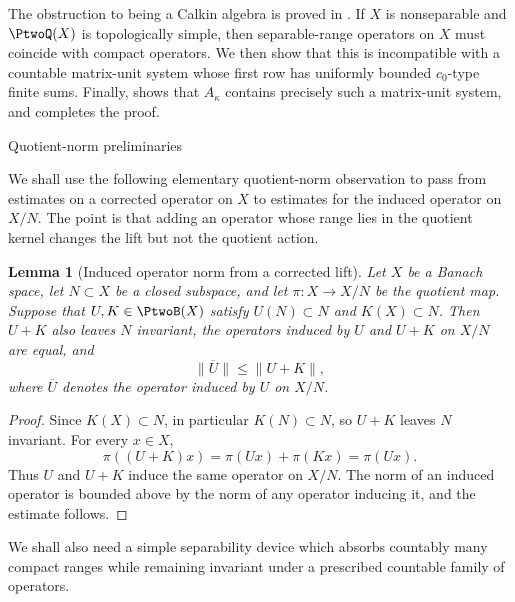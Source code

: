 \documentclass[11pt,reqno]{amsart}
\makeatletter
\theoremstyle{plain}
\newtheorem{lemma}[lemma]{Lemma}
\theoremstyle{definition}
\newcounter{problempaper}
\newenvironment{problempaperbody}{%
  \setcounter{subsection}{0}%
  \setcounter{subsubsection}{0}%
  \setcounter{paragraph}{0}%
  \renewcommand{\thesubsection}{\arabic{subsection}}%
  \renewcommand{\thesubsubsection}{\thesubsection.\arabic{subsubsection}}%
  \renewcommand{\theparagraph}{\thesubsubsection.\arabic{paragraph}}%
  \let\problem@outersection\section
  \let\problem@outersubsection\subsection
  \let\problem@outersubsubsection\subsubsection
  \let\problem@outerparagraph\paragraph
  \let\section\problem@papersection
  \let\subsection\problem@papersubsection
  \let\subsubsection\problem@papersubsubsection
}{%
  \let\section\problem@outersection
  \let\subsection\problem@outersubsection
  \let\subsubsection\problem@outersubsubsection
  \let\paragraph\problem@outerparagraph
}
\newcommand{\problem@target}[2]{%
  \hypertarget{problem-\theproblempaper-#1-#2}{}%
}
\newcommand{\problem@paperheading}[3]{%
  \par\bigskip
  \problem@target{#1}{#2}%
  \noindent{\large\bfseries #2.\quad #3\par}%
  \nobreak\smallskip
}
\newcommand{\problem@papersubheading}[3]{%
  \par\medskip
  \problem@target{#1}{#2}%
  \noindent{\normalsize\bfseries #2.\quad #3\par}%
  \nobreak\smallskip
}
\newcommand{\problem@papersubsubheading}[3]{%
  \par\smallskip
  \problem@target{#1}{#2}%
  \noindent{\normalsize\itshape #2.\quad #3.\ }%
}
\def\problem@papersection{%
  \@ifstar{\problem@papersectionstar}{\problem@papersectionnostar}%
}
\def\problem@papersectionstar#1{%
  \par\bigskip\noindent{\large\bfseries #1\par}\nobreak\smallskip
}
\def\problem@papersectionnostar#1{%
  \refstepcounter{subsection}%
  \setcounter{subsubsection}{0}%
  \setcounter{paragraph}{0}%
  \problem@paperheading{section}{\thesubsection}{#1}%
  \problem@writecontentsline{section}{\thesubsection}{#1}%
}
\def\problem@papersubsection{%
  \@ifstar{\problem@papersubsectionstar}{\problem@papersubsectionnostar}%
}
\def\problem@papersubsectionstar#1{%
  \par\medskip\noindent{\normalsize\bfseries #1\par}\nobreak\smallskip
}
\def\problem@papersubsectionnostar#1{%
  \refstepcounter{subsubsection}%
  \setcounter{paragraph}{0}%
  \problem@papersubheading{subsection}{\thesubsubsection}{#1}%
  \problem@writecontentsline{subsection}{\thesubsubsection}{#1}%
}
\def\problem@papersubsubsection{%
  \@ifstar{\problem@papersubsubsectionstar}{\problem@papersubsubsectionnostar}%
}
\def\problem@papersubsubsectionstar#1{%
  \par\smallskip\noindent{\normalsize\itshape #1.\ }%
}
\def\problem@papersubsubsectionnostar#1{%
  \refstepcounter{paragraph}%
  \problem@papersubsubheading{subsubsection}{\theparagraph}{#1}%
  \problem@writecontentsline{subsubsection}{\theparagraph}{#1}%
}
\newcommand{\problem@writecontentsline}[3]{%
  \begingroup
  \protected@write\@auxout{}{%
    \string\problemcontentsentry{\theproblempaper}{#1}{#2}{#3}{\thepage}%
  }%
  \endgroup
}
\newcommand{\problemcontentsentry}[5]{%
  \@ifundefined{problemcontents@#1}{%
    \expandafter\gdef\csname problemcontents@#1\endcsname{}%
  }{}%
  \expandafter\g@addto@macro\csname problemcontents@#1\endcsname{%
    \problemcontentsline{#1}{#2}{#3}{#4}{#5}%
  }%
}
\newcommand{\problemcontentslink}[4]{%
  \hyperlink{problem-#1-#2-#3}{#4}%
}
\newcommand{\problemcontentsline}[5]{%
  \ifstrequal{#2}{section}{%
    \par\noindent
    \problemcontentslink{#1}{#2}{#3}{\makebox[2.5em][l]{#3}#4}%
    \nobreak\dotfill
    \problemcontentslink{#1}{#2}{#3}{#5}\par
  }{%
    \ifstrequal{#2}{subsection}{%
      \par\noindent\hspace*{1.5em}%
      \problemcontentslink{#1}{#2}{#3}{\makebox[3.5em][l]{#3}#4}%
      \nobreak\dotfill
      \problemcontentslink{#1}{#2}{#3}{#5}\par
    }{%
      \par\noindent\hspace*{3em}%
      \problemcontentslink{#1}{#2}{#3}{\makebox[4.5em][l]{#3}#4}%
      \nobreak\dotfill
      \problemcontentslink{#1}{#2}{#3}{#5}\par
    }%
  }%
}
\makeatother
\begin{document}
\begin{problempaperbody}
The obstruction to being a Calkin algebra is proved in . If $X$ is nonseparable and $\PtwoQ(X)$ is topologically simple, then separable-range operators on $X$ must coincide with compact operators. We then show that this is incompatible with a countable matrix-unit system whose first row has uniformly bounded $c_0$-type finite sums. Finally,  shows that $A_\kappa$ contains precisely such a matrix-unit system, and  completes the proof.


\subsection{Quotient-norm preliminaries}
\label{p2-first:sec:quotient-preliminaries}

We shall use the following elementary quotient-norm observation to pass from estimates on a corrected operator on $X$ to estimates for the induced operator on $X/N$. The point is that adding an operator whose range lies in the quotient kernel changes the lift but not the quotient action.

\begin{lemma}[Induced operator norm from a corrected lift]
\label{p2-first:lem:quotient-correction}
Let $X$ be a Banach space, let $N\subset X$ be a closed subspace, and let $\pi \colon X\to X/N$ be the quotient map. Suppose that $U,K\in\PtwoB(X)$ satisfy $U(N)\subset N$ and $K(X)\subset N$. Then $U+K$ also leaves $N$ invariant, the operators induced by $U$ and $U+K$ on $X/N$ are equal, and
\begin{equation*}
        \|\overline U\|\leq \|U+K\|,
\end{equation*}
where $\overline U$ denotes the operator induced by $U$ on $X/N$.
\end{lemma}

\begin{proof}
Since $K(X)\subset N$, in particular $K(N)\subset N$, so $U+K$ leaves $N$ invariant. For every $x\in X$,
\begin{equation*}
        \pi((U+K)x)=\pi(Ux)+\pi(Kx)=\pi(Ux).
\end{equation*}
Thus $U$ and $U+K$ induce the same operator on $X/N$. The norm of an induced operator is bounded above by the norm of any operator inducing it, and the estimate follows.
\end{proof}

We shall also need a simple separability device which absorbs countably many compact ranges while remaining invariant under a prescribed countable family of operators.


\end{problempaperbody}
\end{document}
